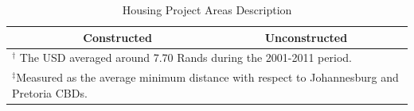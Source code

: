 \documentclass[12pt]{article}
\begin{document}
\vspace{0mm}
\begin{table}[h!]
\centering
\caption{Housing Project Areas Description}\label{table:projectdescriptives}
\vspace{0mm}
\begin{tabular}{l*{1}{cc}}
\toprule
  &Constructed & Unconstructed \\
\midrule

\bottomrule
\multicolumn{3}{l}{\scriptsize $^\dagger$ The USD averaged around 7.70 Rands during the 2001-2011 period.}\\[-.5em]
\multicolumn{3}{l}{\scriptsize $^\ddagger$Measured as the average minimum distance with respect to Johannesburg and Pretoria CBDs. } \\[-.5em]
\end{tabular}
\end{table} 



\end{document}
